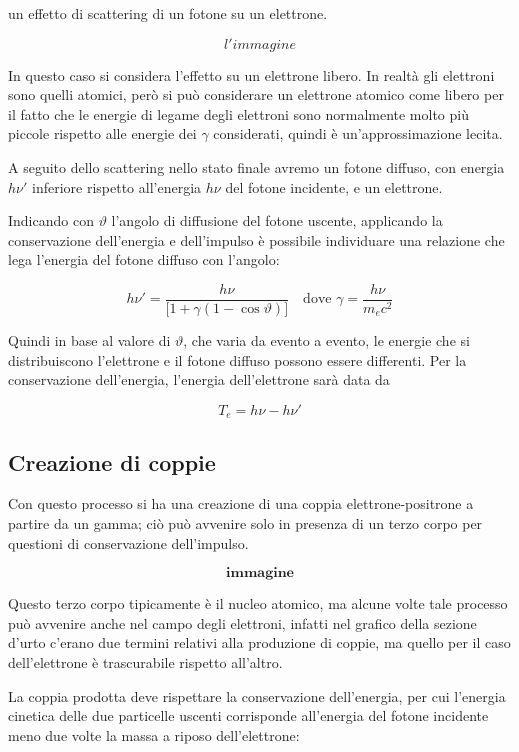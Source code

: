 \E un effetto di scattering di un fotone su un elettrone.

$$l'immagine$$

In questo caso si considera l'effetto su un elettrone libero. In realtà gli elettroni sono quelli atomici, però si può considerare un elettrone atomico come libero per il fatto che le energie di legame degli elettroni sono normalmente molto più piccole rispetto alle energie dei $\gamma$ considerati, quindi è un'approssimazione lecita. 

A seguito dello scattering nello stato finale avremo un fotone diffuso, con energia $h\nu'$ inferiore rispetto all'energia $h\nu$ del fotone incidente, e un elettrone.

Indicando con $\vartheta$ l'angolo di diffusione del fotone uscente, applicando la conservazione dell'energia e dell'impulso è possibile individuare una relazione che lega l'energia del fotone diffuso con l'angolo:

$$h\nu'=\frac{h\nu}{\big[1 + \gamma (1 - \cos{\vartheta})\big]}
\quad\text{dove }
\gamma=\frac{h\nu}{m_ec^2}$$

Quindi in base al valore di $\vartheta$, che varia da evento a evento, le energie che si distribuiscono l'elettrone e il fotone diffuso possono essere differenti.
Per la conservazione dell'energia, l'energia dell'elettrone sarà data da

$$T_e=h\nu - h\nu'$$



\subsection{Creazione di coppie}

Con questo processo si ha una creazione di una coppia elettrone-positrone a partire da un gamma; ciò può avvenire solo in presenza di un terzo corpo per questioni di conservazione dell'impulso.

$$\textbf{immagine}$$

Questo terzo corpo tipicamente è il nucleo atomico, ma alcune volte tale processo può avvenire anche nel campo degli elettroni, infatti nel grafico della sezione d'urto c'erano due termini relativi alla produzione di coppie, ma quello per il caso dell'elettrone è trascurabile rispetto all'altro.

La coppia prodotta deve rispettare la conservazione dell'energia, per cui l'energia cinetica delle due particelle uscenti corrisponde all'energia del fotone incidente meno due volte la massa a riposo dell'elettrone:

